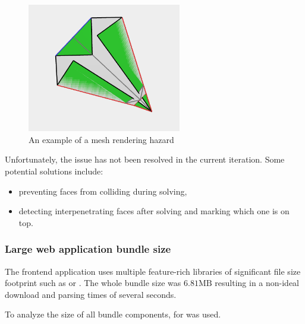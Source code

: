 \begin{figure}[H]
	\caption{An example of a mesh rendering hazard}
  \centering
    \includegraphics[width=0.6\textwidth]{assets/3-rendering-hazard.png}
\end{figure}

Unfortunately, the issue has not been resolved in the current iteration. Some potential solutions include:
\begin{itemize}
	\item preventing faces from colliding during solving,
	\item detecting interpenetrating faces after solving and marking which one is on top.
\end{itemize}

\subsubsection{Large web application bundle size}

The frontend application uses multiple feature-rich libraries of significant file size footprint such as  or . The whole bundle size was $ 6.81\mathrm{MB} $ resulting in a non-ideal download and parsing times of several seconds.

\medskip
To analyze the size of all bundle components,  for  was used. 

\medskip

